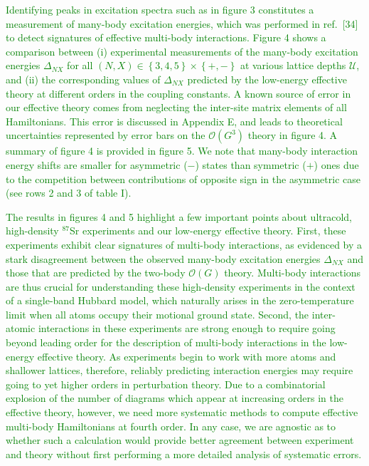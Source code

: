 \documentclass[preprint]{revtex4-1}
\newcommand{\p}[1]{\left(#1\right)} %
\renewcommand{\set}[1]{\left\{#1\right\}} %
\renewcommand{\O}{\mathcal{O}}
\newcommand{\U}{\mathcal{U}}
\newcommand{\1}{\mathds{1}}
\newcommand{\green}[1]{\textcolor{green}{#1}}
\begin{document}
\begin{enumerate}
  \green{Identifying peaks in excitation spectra such as in figure 3
    constitutes a measurement of many-body excitation energies, which
    was performed in ref.~[34] to detect signatures of effective
    multi-body interactions.  Figure 4 shows a comparison between (i)
    experimental measurements of the many-body excitation energies
    $\Delta_{NX}$ for all $\p{N,X}\in\set{3,4,5}\times\set{+,-}$ at
    various lattice depths $\U$, and (ii) the corresponding values of
    $\Delta_{NX}$ predicted by the low-energy effective theory at
    different orders in the coupling constants.  A known source of
    error in our effective theory comes from neglecting the inter-site
    matrix elements of all Hamiltonians.  This error is discussed in
    Appendix E, and leads to theoretical uncertainties represented by
    error bars on the $\O\p{G^3}$ theory in figure 4.  A summary of
    figure 4 is provided in figure 5.  We note that many-body
    interaction energy shifts are smaller for asymmetric ($-$) states
    than symmetric ($+$) ones due to the competition between
    contributions of opposite sign in the asymmetric case (see rows 2
    and 3 of table I).}

  \green{The results in figures 4 and 5 highlight a few important
    points about ultracold, high-density ${}^{87}$Sr experiments and
    our low-energy effective theory.  First, these experiments exhibit
    clear signatures of multi-body interactions, as evidenced by a
    stark disagreement between the observed many-body excitation
    energies $\Delta_{NX}$ and those that are predicted by the
    two-body $\O\p{G}$ theory.  Multi-body interactions are thus
    crucial for understanding these high-density experiments in the
    context of a single-band Hubbard model, which naturally arises in
    the zero-temperature limit when all atoms occupy their motional
    ground state.  Second, the inter-atomic interactions in these
    experiments are strong enough to require going beyond leading
    order for the description of multi-body interactions in the
    low-energy effective theory.  As experiments begin to work with
    more atoms and shallower lattices, therefore, reliably predicting
    interaction energies may require going to yet higher orders in
    perturbation theory.  Due to a combinatorial explosion of the
    number of diagrams which appear at increasing orders in the
    effective theory, however, we need more systematic methods to
    compute effective multi-body Hamiltonians at fourth order.  In any
    case, we are agnostic as to whether such a calculation would
    provide better agreement between experiment and theory without
    first performing a more detailed analysis of systematic errors.}


\end{enumerate}
\end{document}
